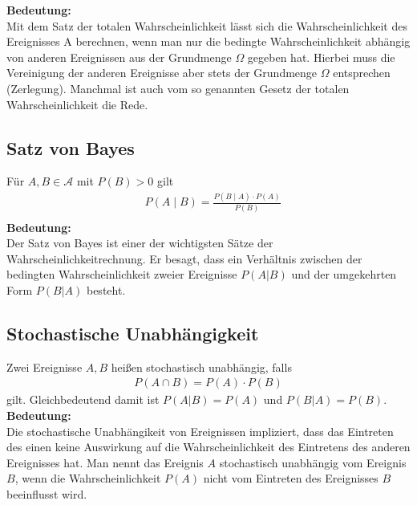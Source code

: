 \documentclass[a4paper]{article}
\begin{document}
\textbf{Bedeutung:}\\
Mit dem Satz der totalen Wahrscheinlichkeit lässt sich die Wahrscheinlichkeit des Ereignisses A berechnen, wenn man nur die bedingte Wahrscheinlichkeit abhängig von anderen Ereignissen aus der Grundmenge $\Omega$ gegeben hat. Hierbei muss die Vereinigung der anderen Ereignisse aber stets der Grundmenge $\Omega$ entsprechen (Zerlegung). Manchmal ist auch vom so genannten Gesetz der totalen Wahrscheinlichkeit die Rede.

\subsection{Satz von Bayes}
Für $A,B \in \mathcal{A}$ mit  $P(B) > 0$ gilt
\begin{align*}
& P(A \; | \;  B) = \frac{P(B \; | \; A) \cdot P(A)} {P(B)} \\
\end{align*}
\textbf{Bedeutung:}\\
Der Satz von Bayes ist einer der wichtigsten Sätze der Wahrscheinlichkeitrechnung. Er besagt, dass ein Verhältnis zwischen der bedingten Wahrscheinlichkeit zweier Ereignisse $P(A | B)$ und der umgekehrten Form $P(B | A)$ besteht.

\subsection{Stochastische Unabhängigkeit}
Zwei Ereignisse $A,B$ heißen stochastisch unabhängig, falls
\begin{align*}
P(A \cap B) = P(A) \cdot P(B)
\end{align*}
gilt.  Gleichbedeutend damit ist  $P(A | B) = P(A)$ und $P(B  | A) = P(B)$.\\

\textbf{Bedeutung:}\\
Die stochastische Unabhängikeit von Ereignissen impliziert, dass das Eintreten des einen keine Auswirkung auf die Wahrscheinlichkeit des Eintretens des anderen Ereignisses hat. Man nennt das Ereignis $A$ stochastisch unabhängig vom Ereignis $B$, wenn die Wahrscheinlichkeit $P(A)$ nicht vom Eintreten des Ereignisses $B$ beeinflusst wird.
\end{document}
